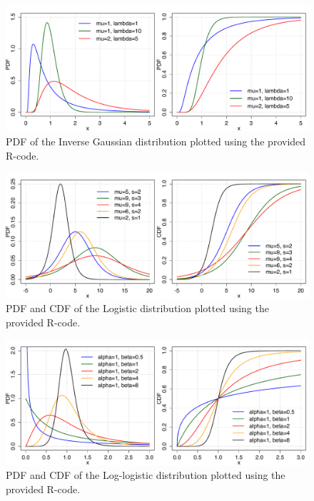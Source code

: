 \begin{figure}[htb!]
\centering
  \includegraphics[width=140mm]{pics/InverseGaussian_pdf_cdf.pdf}
 \caption{PDF of the Inverse Gaussian distribution plotted using the provided R-code.}
 \label{fig:InverseGaussian_pdf_cdf}
\end{figure}

\begin{figure}[htb!]
\centering
  \includegraphics[width=140mm]{pics/Logistic_pdf_cdf.pdf}
 \caption{PDF and CDF of the Logistic distribution plotted using the provided R-code.}
 \label{fig:Logistic_pdf_cdf}
\end{figure}

\begin{figure}[htb!]
\centering
  \includegraphics[width=140mm]{pics/LogLogistic_pdf_cdf.pdf}
 \caption{PDF and CDF of the Log-logistic distribution plotted using the provided R-code.}
 \label{fig:LogLogistic_pdf_cdf}
\end{figure}

